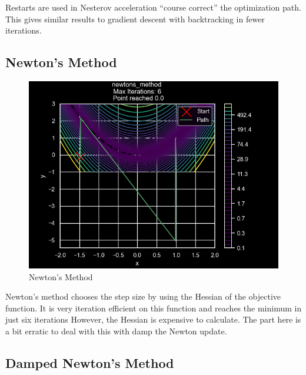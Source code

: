 \documentclass[
]{article}
\begin{document}
Restarts are used in Nesterov acceleration ``course correct'' the optimization path. This gives similar results to gradient descent with backtracking in fewer iterations.

\subsection{Newton's Method}\label{newtons-method}

\begin{figure}
\centering
\includegraphics{images/newtons_method.png}
\caption{Newton's Method}
\end{figure}

Newton's method chooses the step size by using the Hessian of the objective function. It is very iteration efficient on this function and reaches the minimum in just six iterations However, the Hessian is expensive to calculate. The part here is a bit erratic to deal with this with damp the Newton update.

\subsection{Damped Newton's Method}\label{damped-newtons-method}
\end{document}
